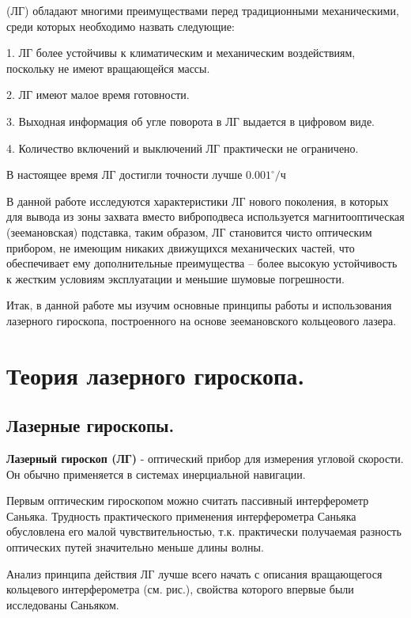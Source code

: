 \documentclass[a4paper,12pt]{article} %
\begin{document}
(ЛГ) обладают многими преимуществами перед традиционными механическими, среди которых необходимо назвать следующие:

1. ЛГ более устойчивы к климатическим и механическим воздействиям,
поскольку не имеют вращающейся массы.

2. ЛГ имеют малое время готовности.

3. Выходная информация об угле поворота в ЛГ выдается в цифровом
виде.

4. Количество включений и выключений ЛГ практически не ограничено.

В настоящее время ЛГ достигли точности лучше $0.001 ^\circ/\text{ч}$

В данной работе исследуются характеристики ЛГ нового поколения, в которых для вывода из зоны захвата вместо виброподвеса используется магнитооптическая (зеемановская) подставка, таким образом, ЛГ становится чисто оптическим прибором, не имеющим никаких движущихся механических частей, что обеспечивает ему дополнительные преимущества – более высокую устойчивость к жестким условиям эксплуатации и меньшие шумовые погрешности.

Итак, в данной работе мы изучим основные принципы работы и использования лазерного гироскопа, построенного на основе зеемановского кольцеового лазера.

\section{Теория лазерного гироскопа.}

\subsection{Лазерные гироскопы.}
 
\textbf{Лазерный гироскоп (ЛГ)} - оптический прибор для измерения угловой
скорости. Он обычно применяется в системах инерциальной навигации.

Первым оптическим гироскопом можно считать пассивный интерферометр
Саньяка. Трудность практического применения интерферометра Саньяка
обусловлена его малой чувствительностью, т.к. практически получаемая разность оптических путей значительно меньше длины волны.

Анализ принципа действия ЛГ лучше всего начать с описания вращающегося кольцевого интерферометра (см. рис.), свойства которого впервые были исследованы Саньяком.
\end{document}
